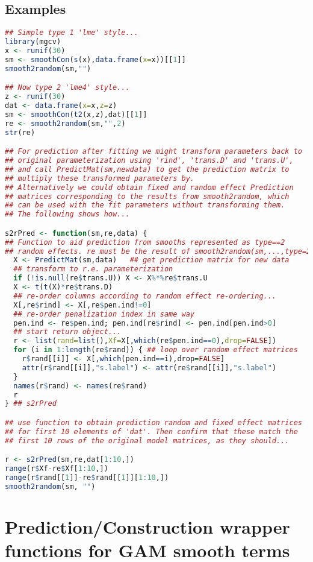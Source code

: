 \documentclass{article}
\begin{document}
\subsection{Examples}
\begin{lstlisting}[language=R]
## Simple type 1 'lme' style...
library(mgcv)
x <- runif(30)
sm <- smoothCon(s(x),data.frame(x=x))[[1]]
smooth2random(sm,"")

## Now type 2 'lme4' style...
z <- runif(30)
dat <- data.frame(x=x,z=z)
sm <- smoothCon(t2(x,z),dat)[[1]]
re <- smooth2random(sm,"",2)
str(re)

## For prediction after fitting we might transform parameters back to
## original parameterization using 'rind', 'trans.D' and 'trans.U',
## and call PredictMat(sm,newdata) to get the prediction matrix to
## multiply these transformed parameters by.
## Alternatively we could obtain fixed and random effect Prediction
## matrices corresponding to the results from smooth2random, which
## can be used with the fit parameters without transforming them.
## The following shows how...

s2rPred <- function(sm,re,data) {
## Function to aid prediction from smooths represented as type==2
## random effects. re must be the result of smooth2random(sm,...,type=2).
  X <- PredictMat(sm,data)   ## get prediction matrix for new data
  ## transform to r.e. parameterization
  if (!is.null(re$trans.U)) X <- X%*%re$trans.U
  X <- t(t(X)*re$trans.D)
  ## re-order columns according to random effect re-ordering...
  X[,re$rind] <- X[,re$pen.ind!=0] 
  ## re-order penalization index in same way  
  pen.ind <- re$pen.ind; pen.ind[re$rind] <- pen.ind[pen.ind>0]
  ## start return object...
  r <- list(rand=list(),Xf=X[,which(re$pen.ind==0),drop=FALSE])
  for (i in 1:length(re$rand)) { ## loop over random effect matrices
    r$rand[[i]] <- X[,which(pen.ind==i),drop=FALSE]
    attr(r$rand[[i]],"s.label") <- attr(re$rand[[i]],"s.label")
  }
  names(r$rand) <- names(re$rand)
  r
} ## s2rPred

## use function to obtain prediction random and fixed effect matrices
## for first 10 elements of 'dat'. Then confirm that these match the
## first 10 rows of the original model matrices, as they should...

r <- s2rPred(sm,re,dat[1:10,])
range(r$Xf-re$Xf[1:10,])
range(r$rand[[1]]-re$rand[[1]][1:10,])
smooth2random(sm, "")
\end{lstlisting}


\section{Prediction/Construction wrapper functions for GAM smooth terms}
\end{document}
